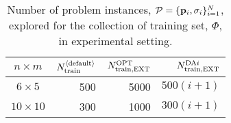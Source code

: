\begin{table}[b]
\centering
\caption[Number of problem instances explored for the collection of training 
set, $\Phi$.]{Number of problem instances, $\mathcal{P} = 
    \{\mathbf{p}_i,{\mathbf{\sigma}}_i\}_{i=1}^{N}$, explored for the collection of training 
    set, $\Phi$, in experimental setting.}
\label{tbl:Ntrain}
\begin{tabular}{crrr} \toprule
$n \times m$  & $N_{\text{train}}^{\langle \text{default} \rangle}$ 
                     & $N_{\text{train},\text{EXT}}^{\text{OPT}}$ 
                              & $N_{\text{train},\text{EXT}}^{\text{DA}i}$ \\ \midrule
$6\times 5$   & 500  & 5000   & $500(i+1)$ \\
$10\times 10$ & 300  & 1000   & $300(i+1)$ \\
\bottomrule
\end{tabular}
\end{table}